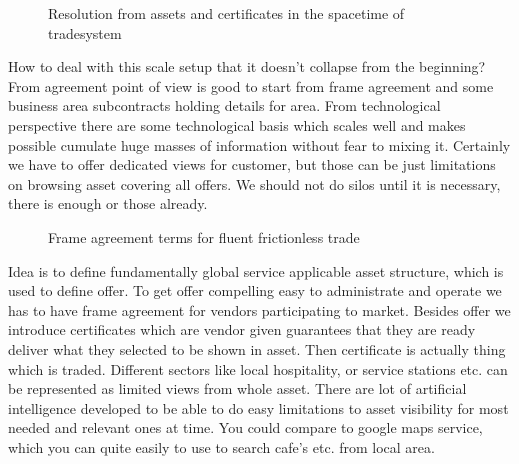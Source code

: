 \begin{figure} %
 \begin{center}
  \caption{Resolution from assets and certificates in the spacetime of tradesystem}
  \label{fig:resolut}
 \end{center}
\end{figure}

How to deal with this scale setup that it doesn't collapse from the beginning?
From agreement point of view is good to start from frame agreement and some
business area subcontracts holding details for area. From technological
perspective there are some technological basis which scales well and makes
possible cumulate huge masses of information without fear to mixing it.
Certainly we have to offer dedicated views for customer, but those can be just
limitations on browsing asset covering all offers. We should not do silos
until it is necessary, there is enough or those already.

\begin{figure} %
 \begin{center}
  \caption{Frame agreement terms for fluent frictionless trade}
  \label{fig:terms}
 \end{center}
\end{figure}

Idea is to define fundamentally global service applicable asset structure,
which is used to define offer. To get offer compelling easy to administrate
and operate we has to have frame agreement for vendors participating to
market. Besides offer we introduce certificates which are vendor given
guarantees that they are ready deliver what they selected to be shown in
asset. Then certificate is actually thing which is traded. Different sectors
like local hospitality, or service stations etc. can be represented as
limited views from whole asset. There are lot of artificial intelligence
developed to be able to do easy limitations to asset visibility for most
needed and relevant ones at time. You could compare to google maps service,
which you can quite easily to use to search cafe's etc. from local area.

